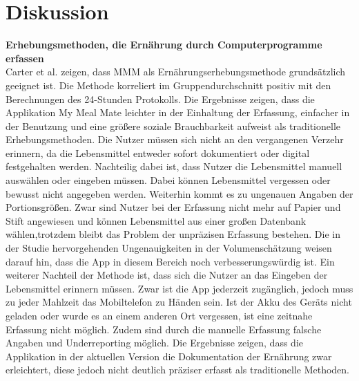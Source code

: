 \newpage
\section{Diskussion}

\textbf{Erhebungsmethoden, die Ernährung durch Computerprogramme erfassen}\\
Carter et al. zeigen, dass MMM als Ernährungserhebungsmethode grundsätzlich geeignet ist. Die Methode korreliert im Gruppendurchschnitt positiv mit den Berechnungen des 24-Stunden Protokolls. Die Ergebnisse zeigen, dass die Applikation My Meal Mate leichter in der Einhaltung der Erfassung, einfacher in der Benutzung und eine größere soziale Brauchbarkeit aufweist als traditionelle Erhebungsmethoden. Die Nutzer müssen sich nicht an den vergangenen Verzehr erinnern, da die Lebensmittel entweder sofort dokumentiert oder digital festgehalten werden. Nachteilig dabei ist, dass Nutzer die Lebensmittel manuell auswählen oder eingeben müssen. Dabei können Lebensmittel vergessen oder bewusst nicht angegeben werden. Weiterhin kommt es zu ungenauen Angaben der Portionsgrößen. Zwar sind Nutzer bei der Erfassung nicht mehr auf Papier und Stift angewiesen und können Lebensmittel aus einer großen Datenbank wählen,trotzdem bleibt das Problem der unpräzisen Erfassung bestehen. Die in der Studie hervorgehenden Ungenauigkeiten in der  Volumenschätzung weisen darauf hin, dass die App in diesem Bereich noch verbesserungswürdig ist. Ein weiterer Nachteil der Methode ist, dass sich die Nutzer an das Eingeben der Lebensmittel erinnern müssen. Zwar ist die App jederzeit zugänglich, jedoch muss zu jeder Mahlzeit das Mobiltelefon zu Händen sein. Ist der Akku des Geräts nicht geladen oder wurde es an einem anderen Ort vergessen, ist eine zeitnahe Erfassung nicht möglich. Zudem sind durch die manuelle Erfassung falsche Angaben und Underreporting möglich. Die Ergebnisse zeigen, dass die Applikation in der aktuellen Version die Dokumentation der Ernährung zwar erleichtert, diese jedoch nicht deutlich präziser erfasst als traditionelle Methoden.\\
